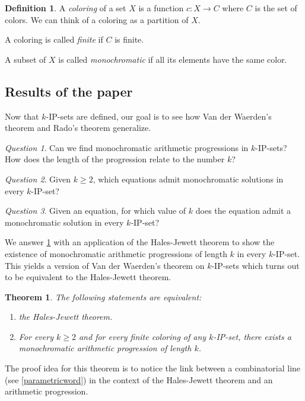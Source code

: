 \documentclass{article}
\theoremstyle{definition}
\newtheorem{definition}{Definition}[section]
\theoremstyle{plain}
\newtheorem{maintheorem}{Theorem}
\theoremstyle{remark}
\newtheorem{question}{Question}[section]
\begin{document}
    \begin{definition}
        A \emph{coloring} of a set $X$ is a function $c:X \to C$ where $C$ is the set of colors. We can think of a coloring as a partition of $X$.
    
        A coloring is called \emph{finite} if $C$ is finite.
    
        A subset of $X$ is called \emph{monochromatic} if all its elements have the same color.
    \end{definition}

\subsection{Results of the paper}

Now that $k$-IP-sets are defined, our goal is to see how Van der Waerden's theorem and Rado's theorem generalize.
\begin{question}\label{questionVDW_IP}
    Can we find monochromatic arithmetic progressions in $k$-IP-sets? How does the length of the progression relate to the number $k$?
\end{question}
\begin{question}\label{questionRadoIPfixk}
    Given $k \geq 2$, which equations admit monochromatic solutions in every $k$-IP-set?
\end{question}
\begin{question}\label{questionRadoIPfixeq}
    Given an equation, for which value of $k$ does the equation admit a monochromatic solution in every $k$-IP-set?
\end{question}

We answer \cref{questionVDW_IP} with an application of the Hales-Jewett theorem to show the existence of monochromatic arithmetic progressions of length $k$ in every $k$-IP-set. This yields a version of Van der Waerden's theorem on $k$-IP-sets which turns out to be equivalent to the Hales-Jewett theorem.
\begin{maintheorem}\label{INTRO_HJ_equiv_VDWforIP}
    The following statements are equivalent:
    \begin{enumerate}
        \item the Hales-Jewett theorem.
        \item For every $k \geq 2$ and for every finite coloring of any $k$-IP-set, there exists a monochromatic arithmetic progression of length $k$.
    \end{enumerate}
\end{maintheorem}
The proof idea for this theorem is to notice the link between a combinatorial line (see \cref{parametricword}) in the context of the Hales-Jewett theorem and an arithmetic progression.
\end{document}
